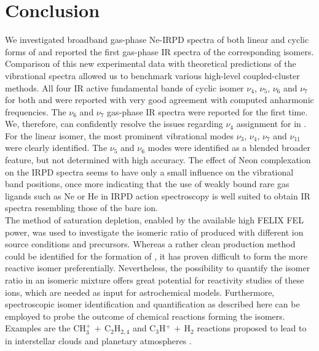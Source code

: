 \section{Conclusion}
\vspace{0.5cm}
We investigated broadband gas-phase Ne-IRPD spectra of both linear and cyclic forms of \iso and reported the first gas-phase IR spectra of the corresponding \isoD isomers. Comparison of this new experimental data with theoretical predictions of the vibrational spectra allowed us to benchmark various high-level coupled-cluster methods. All four IR active fundamental bands of cyclic isomer $\nu_4$, $\nu_5$, $\nu_6$ and $\nu_7$ for both \iso and \isoD were reported with very good agreement with computed anharmonic frequencies. The $\nu_6$ and $\nu_7$ gas-phase IR spectra were reported for the first time. We, therefore, can confidently resolve the issues regarding $\nu_4$ assignment for \cyc in \citet{RDS2010}. For the linear isomer, the most prominent vibrational modes $\nu_3$, $\nu_4$, $\nu_7$ and $\nu_{11}$ were clearly identified. The $\nu_5$ and $\nu_6$ modes were identified as a blended broader feature, but not determined with high accuracy. The effect of Neon complexation on the IRPD spectra seems to have only a small influence on the vibrational band positions, once more indicating that the use of weakly bound rare gas ligands such as Ne or He in IRPD action spectroscopy is well suited to obtain IR spectra resembling those of the bare ion. \\

The method of saturation depletion, enabled by the available high FELIX FEL power, was used to investigate the isomeric ratio of \iso produced with different ion source conditions and precursors. Whereas a rather clean production method could be identified for the formation of \cyc, it has proven difficult to form the more reactive \lin isomer preferentially. Nevertheless, the possibility to quantify the isomer ratio in an isomeric mixture offers great potential for reactivity studies of these ions, which are needed as input for astrochemical models. Furthermore, spectroscopic isomer identification and quantification as described here can be employed to probe the outcome of chemical reactions forming the \iso isomers. Examples are the CH$_3^+ \, + \, $C$_2$H$_{2,4}$ and C$_3$H$^+ \, + \, $H$_2$ reactions proposed to lead to \iso in interstellar clouds and planetary atmospheres \citep{SA1987,Ali2013}.  \\


